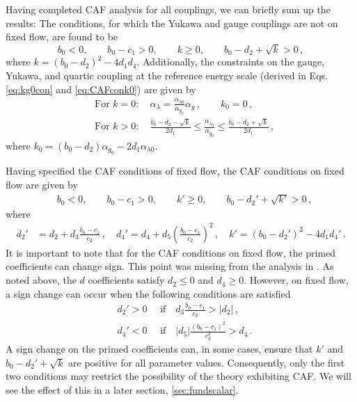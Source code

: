 Having completed CAF analysis for all couplings, we can briefly sum up the results: The conditions, for which the Yukawa and gauge couplings are not on fixed flow, are found to be
\begin{equation}
    b_0<0,\quad\quad b_0-c_1>0,\quad\quad k\geq 0,\quad\quad b_0-d_2+\sqrt{k}>0\,,\label{eq:CAF}
\end{equation}
where $k=(b_0-d_2)^2-4d_1d_4$. Additionally, the constraints on the gauge, Yukawa, and quartic coupling at the reference energy scale (derived in Eqs. \eqref{eq:kg0con} and \eqref{eq:CAFconk0}) are given by
\begin{align}
    &\text{For }k=0: \quad \alpha_{\lambda} = \frac{ \alpha_{\lambda0}  }{ \alpha_{g_0}  } \alpha_g\,,\quad\quad k_0=0\,,\label{eq:CAFalpha}\\&
    \text{For }k>0: \quad 
    \frac{b_0-d_2-\sqrt{k}}{2d_1}\le \frac{\alpha_{\lambda_0}}{\alpha_{g_0}}\le \frac{b_0-d_2+\sqrt{k}}{2d_1}\,, \label{eq:CAFalphafixed}
\end{align}
where $k_0 = (b_0 - d_2)\alpha_{g_0} - 2d_1\alpha_{\lambda0}$. 

Having specified the CAF conditions of fixed flow, the CAF conditions on fixed flow are given by
\begin{align}
    &b_0<0,\quad\quad b_0-c_1>0,\quad\quad k'\geq 0,\quad \quad  b_0-d_2'+\sqrt{k'}>0\,,\label{eq:CAFfixed}
\end{align}  
where 
\begin{align}
    d_2'&=d_2+d_3\frac{b_0-c_1}{c_2}\,,\quad
    d_4'=d_4+d_5\left(\frac{b_0-c_1}{c_2}\right)^2\,,\quad
    k'= \left(b_0-d_2'\right)^2-4d_1d_4'\,.
\end{align}
It is important to note that for the CAF conditions on fixed flow, the primed coefficients can change sign. This point was missing from the analysis in \cite{Pica:2016krb}. As noted above, the $d$ coefficients satisfy $d_2\le0$ and $d_4\ge0$. However, on fixed flow, a sign change can occur when the following conditions are satisfied
\begin{align}
     &d_2'>0 \quad \text{  if}\quad d_3\frac{b_0-c_1}{c_2}>|d_2|\,,
     \\&d_4'<0 \quad \text{  if}\quad |d_5|\frac{(b_0-c_1)^2}{c_2^2}>d_4\,.
\end{align}
A sign change on the primed coefficients can, in some cases, ensure that $k'$ and $b_0-d_2'+\sqrt k$ are positive for all parameter values. Consequently, only the first two conditions may restrict the possibility of the theory exhibiting CAF. We will see the effect of this in a later section, \ref{sec:fundscalar}.

